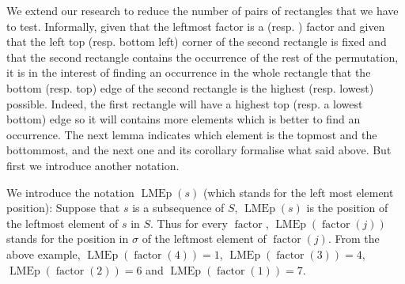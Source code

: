 \documentclass[a4paper]{llncs}
\newcommand{\RLMin}{\text{RLMin}}
\newcommand{\RLMax}{\text{RLMax}}
\newcounter{num}
\DeclareMathOperator{\LMEi}{LMEp}
\DeclareMathOperator{\factor}{factor}
\begin{document}
We extend our research to reduce the number of pairs of rectangles
that we have to test.
Informally,
given that the leftmost factor is a \RLMin (resp. \RLMax) factor and
given that the left top (resp. bottom left) corner of the second rectangle is fixed and
that the second rectangle contains the occurrence of the
rest of the permutation, it is in the interest of finding an occurrence in the whole rectangle
that the bottom (resp. top) edge of the second rectangle is the highest (resp. lowest) possible.
Indeed, the first rectangle will have
a highest top (resp. a lowest bottom) edge so it will contains more elements
which is better to find an occurrence.
The next lemma indicates which element is the topmost and the bottommost,
and the next one and its corollary formalise what said above.
But first we introduce another notation.

We introduce the notation $\LMEi(s)$ (which stands for the left most element position): Suppose that $s$ is a subsequence of $S$, $\LMEi(s)$ is the position of the leftmost element of $s$ in $S$. Thus
for every $\factor$, $\LMEi(\factor(j))$ stands for the position in $\sigma$
of the leftmost element of $\factor(j)$.
From the above example,
$\LMEi(\factor(4)) = 1$, $\LMEi(\factor(3)) = 4$, $\LMEi(\factor(2)) = 6$ and $\LMEi(\factor(1)) = 7$.

%

%
%
%
\end{document}
